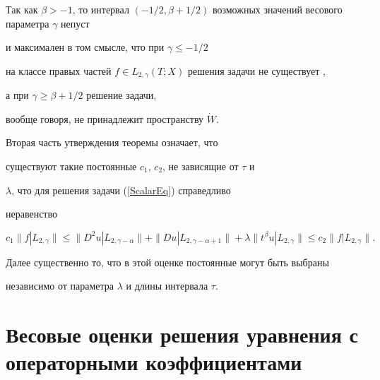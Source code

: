 \begin{note}


Так как $\beta > -1$, то интервал $(-1/2,


\beta+1/2)$ возможных значений весового параметра $\gamma$ непуст


и максимален в том смысле, что при $\gamma \le -1/2$


на классе правых частей $f \in


L_{2,\gamma}(T;X)$ решения задачи не существует ,


а при $\gamma \ge \beta+1/2$ решение задачи,


вообще говоря, не принадлежит пространству $\Dot W$.


\end{note}








\begin{note}


Вторая часть утверждения теоремы означает, что


существуют такие постоянные $c_1$, $c_2$, не зависящие от $\tau$ и


$\lambda$, что для решения задачи (\ref{ScalarEq}) справедливо


неравенство


$$


c_1 \|f|L_{2,\gamma}\| \le   \|D^2 u|L_{2,\gamma-\alpha}\|+


\|D u|L_{2,\gamma-\alpha+1}\| +\lambda \|t^\beta u|L_{2,\gamma}\|


\le c_2 \|f|L_{2,\gamma}\|.


$$


Далее существенно то, что в этой оценке постоянные могут быть выбраны 


независимо от параметра $\lambda$ и длины интервала $\tau$.


\end{note}








\section{Весовые оценки решения уравнения с операторными коэффициентами}


\label{opercoeff}






